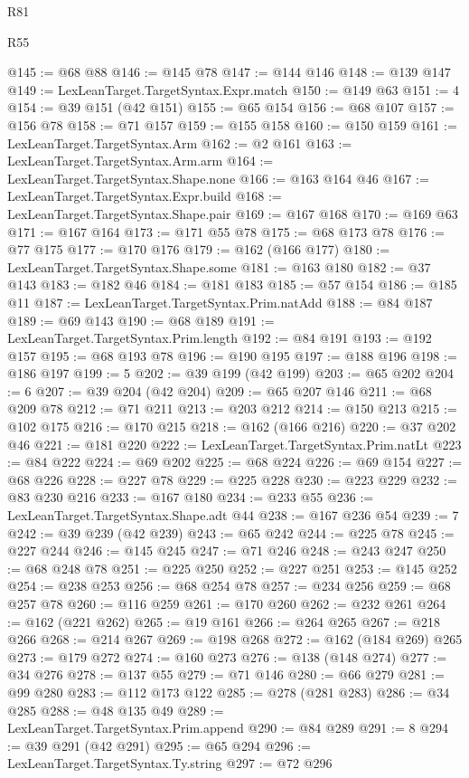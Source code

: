 \begin{lexlean}{R81}
\begin{lexlean}{R55}
\begin{coremodule}
{{{{{{{{{{{{{{{{{{{{{{{{{{{{{{{{{{{{{{{{{{{{{{{{{{{{{{{{{{{{@145 := @68 @88
@146 := @145 @78
@147 := @144 @146
@148 := @139 @147
@149 := LexLeanTarget.TargetSyntax.Expr.match
@150 := @149 @63
@151 := 4
@154 := @39 @151 (@42 @151)
@155 := @65 @154
@156 := @68 @107
@157 := @156 @78
@158 := @71 @157
@159 := @155 @158
@160 := @150 @159
@161 := LexLeanTarget.TargetSyntax.Arm
@162 := @2 @161
@163 := LexLeanTarget.TargetSyntax.Arm.arm
@164 := LexLeanTarget.TargetSyntax.Shape.none
@166 := @163 @164 @46
@167 := LexLeanTarget.TargetSyntax.Expr.build
@168 := LexLeanTarget.TargetSyntax.Shape.pair
@169 := @167 @168
@170 := @169 @63
@171 := @167 @164
@173 := @171 @55 @78
@175 := @68 @173 @78
@176 := @77 @175
@177 := @170 @176
@179 := @162 (@166 @177)
@180 := LexLeanTarget.TargetSyntax.Shape.some
@181 := @163 @180
@182 := @37 @143
@183 := @182 @46
@184 := @181 @183
@185 := @57 @154
@186 := @185 @11
@187 := LexLeanTarget.TargetSyntax.Prim.natAdd
@188 := @84 @187
@189 := @69 @143
@190 := @68 @189
@191 := LexLeanTarget.TargetSyntax.Prim.length
@192 := @84 @191
@193 := @192 @157
@195 := @68 @193 @78
@196 := @190 @195
@197 := @188 @196
@198 := @186 @197
@199 := 5
@202 := @39 @199 (@42 @199)
@203 := @65 @202
@204 := 6
@207 := @39 @204 (@42 @204)
@209 := @65 @207 @146
@211 := @68 @209 @78
@212 := @71 @211
@213 := @203 @212
@214 := @150 @213
@215 := @102 @175
@216 := @170 @215
@218 := @162 (@166 @216)
@220 := @37 @202 @46
@221 := @181 @220
@222 := LexLeanTarget.TargetSyntax.Prim.natLt
@223 := @84 @222
@224 := @69 @202
@225 := @68 @224
@226 := @69 @154
@227 := @68 @226
@228 := @227 @78
@229 := @225 @228
@230 := @223 @229
@232 := @83 @230 @216
@233 := @167 @180
@234 := @233 @55
@236 := LexLeanTarget.TargetSyntax.Shape.adt @44
@238 := @167 @236 @54
@239 := 7
@242 := @39 @239 (@42 @239)
@243 := @65 @242
@244 := @225 @78
@245 := @227 @244
@246 := @145 @245
@247 := @71 @246
@248 := @243 @247
@250 := @68 @248 @78
@251 := @225 @250
@252 := @227 @251
@253 := @145 @252
@254 := @238 @253
@256 := @68 @254 @78
@257 := @234 @256
@259 := @68 @257 @78
@260 := @116 @259
@261 := @170 @260
@262 := @232 @261
@264 := @162 (@221 @262)
@265 := @19 @161
@266 := @264 @265
@267 := @218 @266
@268 := @214 @267
@269 := @198 @268
@272 := @162 (@184 @269) @265
@273 := @179 @272
@274 := @160 @273
@276 := @138 (@148 @274)
@277 := @34 @276
@278 := @137 @55
@279 := @71 @146
@280 := @66 @279
@281 := @99 @280
@283 := @112 @173 @122
@285 := @278 (@281 @283)
@286 := @34 @285
@288 := @48 @135 @49
@289 := LexLeanTarget.TargetSyntax.Prim.append
@290 := @84 @289
@291 := 8
@294 := @39 @291 (@42 @291)
@295 := @65 @294
@296 := LexLeanTarget.TargetSyntax.Ty.string
@297 := @72 @296
}}}}}}}}}}}}}}}}}}}}}}}}}}}}}}}}}}}}}}}}}}}}}}}}}}}}}}}}}}}}
\end{coremodule}
\end{lexlean}
\end{lexlean}
